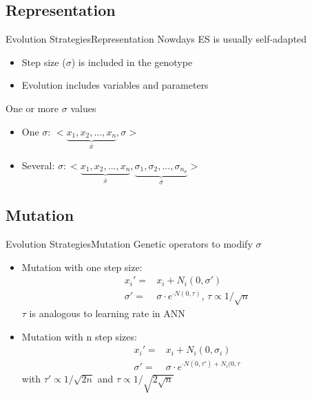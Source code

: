 \documentclass[10pt,compress]{beamer} %
\begin{document}
\subsection{Representation}
\begin{frame}{Evolution Strategies}{Representation}
	Nowdays ES is usually self-adapted
	\begin{itemize}
		\item Step size ($\sigma$) is included in the genotype
		\item Evolution includes variables and parameters
	\end{itemize}
	One or more $\sigma$ values
	\begin{itemize}
		\item One  $\sigma$: $\big<\underbrace{x_1, x_2, ..., x_n}_{\bar{x}},\sigma\big>$
		\item Several: $\sigma : \big<\underbrace{x_1, x_2, ..., x_n}_{\bar{x}},
		\underbrace{\sigma_1, \sigma_2, ..., \sigma_{n_{\sigma}}}_{\bar{\sigma}}\big>$
	\end{itemize}
\end{frame}

\subsection{Mutation}
\begin{frame}{Evolution Strategies}{Mutation}
	Genetic operators to modify $\sigma$
	\begin{itemize}
		\item Mutation with one step size: 
		\begin{subequations}
		\begin{align*}
		x_i' = & x_i + N_i(0, \sigma')\\
		\sigma' = & \sigma \cdot e^{\cdot N(0, \tau)} \text{, } \tau \propto 1/\sqrt{n}
		\end{align*}
		\end{subequations}
		$\tau$ is analogous to learning rate in ANN
		\item Mutation with n step sizes:
		\begin{subequations}
		\begin{align*}
		x_i' = & x_i + N_i(0, \sigma_i)\\
		\sigma' = & \sigma \cdot e^{\cdot N(0, \tau')+N_i(0, \tau}
		\end{align*}
		\end{subequations}
		with $ \tau' \propto 1/\sqrt{2n}$  and $\tau \propto 1/\sqrt{2\sqrt{n}}$
	\end{itemize}
\end{frame}
\end{document}
